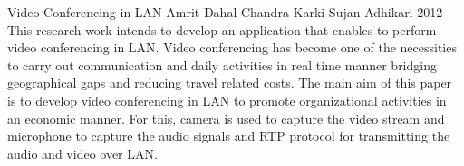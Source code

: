  \begin{conf-abstract}[]
{Video Conferencing in LAN }
{ Amrit Dahal
  Chandra Karki
  Sujan Adhikari
}
{ 2012 }
     This research work intends to develop an application that enables to perform video conferencing in LAN. Video conferencing has become one of the necessities to carry out communication and daily activities in real time manner bridging geographical gaps and reducing travel related costs. The main aim of this paper is to develop video conferencing in LAN to promote organizational activities in an economic manner. For this, camera is used to capture the video stream and microphone to capture the audio signals and RTP protocol for transmitting the audio and video over LAN.  
  \end{conf-abstract}